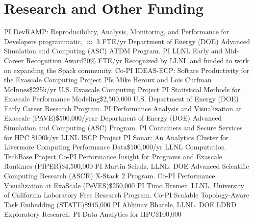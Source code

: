 \section{Research and Other Funding}
		{PI}
		{DevRAMP: Reproducibility, Analysis, Monitoring, and Performance for Developers}
        {}{programmatic, $\approx$ 3 FTE/yr}
		{Department of Energy (DOE) Advanced Simulation and Computing (ASC) ATDM Program.}
		{PI}
		{LLNL Early and Mid-Career Recognition Award}{}{20\% FTE/yr}
		{Recognized by LLNL and funded to work on expanding the Spack community.}
		{Co-PI}
		{IDEAS-ECP: Softare Productivity for the Exascale Computing Project}
        {PIs Mike Heroux and Lois Curfman McInnes}{\$225k/yr}
		{U.S. Exascale Computing Project}
		{PI}
		{Statistical Methods for Exascale Performance Modeling}{}{\$2,500,000}
		{U.S. Department of Energy (DOE) Early Career Research Program.}
		{PI}
		{Performance Analysis and Visualization at Exascale (PAVE)}{}{\$500,000/year}
		{%
		 Department of Energy (DOE) Advanced Simulation and Computing (ASC) Program.}
		{PI}
		{Containers and Secure Services for HPC}
        {}{\$100k/yr}
		{LLNL ISCP Project}
		{PI}
		{Sonar: An Analytics Cluster for Livermore Computing Performance Data}{}{\$100,000/yr}
		{LLNL Computation TechBase Project}
		{Co-PI}
		{Performance Insight for Programs and Exascale Runtimes (PIPER)}{}{\$4,500,000}
		{PI Martin Schulz, LLNL. DOE Advanced Scientific Computing Research (ASCR)
		 X-Stack 2 Program.}
		{Co-PI}
		{Performance Visualization at ExaScale (PeVES)}{}{\$250,000}
		{PI Timo Bremer, LLNL. University of California Laboratory Fees Research Program.}
		{Co-PI}
		{Scalable Topology-Aware Task Embedding (STATE)}{}{\$945,000}
		{PI Abhinav Bhatele, LLNL. DOE LDRD Exploratory Research.}
		{PI}
		{Data Analytics for HPC}{}{\$100,000}
		{}
